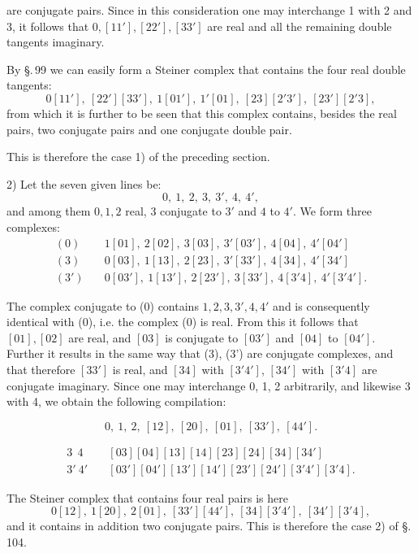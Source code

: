 are conjugate pairs. Since in this consideration one may interchange 1 with 2
and 3, it follows that $0, [11'], [22'], [33']$
are real and all the remaining double tangents imaginary.

By \S.\,99 we can easily form a Steiner complex
that contains the four real double tangents:
\[
0[11'],\ [22'][33'],\ 1[01'],\ 1'[01],\ [23][2'3'],\ [23'][2'3],
\]
from which it is further to be seen that this complex contains, besides the real
pairs, two conjugate pairs and one conjugate double pair.

This is therefore the case 1) of the preceding section.

2) Let the seven given lines be:
\[
0,\ 1,\ 2,\ 3,\ 3',\ 4,\ 4',
\]
and among them $0, 1, 2$ real, $3$ conjugate to $3'$ and $4$ to $4'$. We
form three complexes:
\[
\begin{aligned}
(0)&\quad 1[01],\ 2[02],\ 3[03],\ 3'[03'],\ 4[04],\ 4'[04']\\
(3)&\quad 0[03],\ 1[13],\ 2[23],\ 3'[33'],\ 4[34],\ 4'[34']\\
(3')&\quad 0[03'],\ 1[13'],\ 2[23'],\ 3[33'],\ 4[3'4],\ 4'[3'4'].
\end{aligned}
\]

The complex conjugate to (0) contains $1, 2, 3, 3', 4, 4'$ and
is consequently identical with (0), i.e. the complex (0) is real.
From this it follows that $[01], [02]$ are real, and $[03]$ is conjugate to $[03']$ and $[04]$
to $[04']$. Further it results in the same
way that (3), (3') are conjugate complexes, and that therefore
$[33']$ is real, and $[34]$ with $[3'4']$, $[34']$ with $[3'4]$ are conjugate imaginary.
Since one may interchange 0, 1, 2 arbitrarily, and likewise 3
with 4, we obtain the following compilation:

\begin{center}
\end{center}
\[
0,\ 1,\ 2,\ [12],\ [20],\ [01],\ [33'],\ [44'].
\]

\begin{center}
\end{center}
\[
\begin{aligned}
3\ \ 4 &\quad [03][04][13][14][23][24][34][34']\\
3'\ 4' &\quad [03'][04'][13'][14'][23'][24'][3'4'][3'4].
\end{aligned}
\]

The Steiner complex that contains four real pairs
is here
\[
0[12],\ 1[20],\ 2[01],\ [33'][44'],\ [34][3'4'],\ [34'][3'4],
\]
and it contains in addition two conjugate pairs. This is therefore the
case 2) of \S.\,104.
